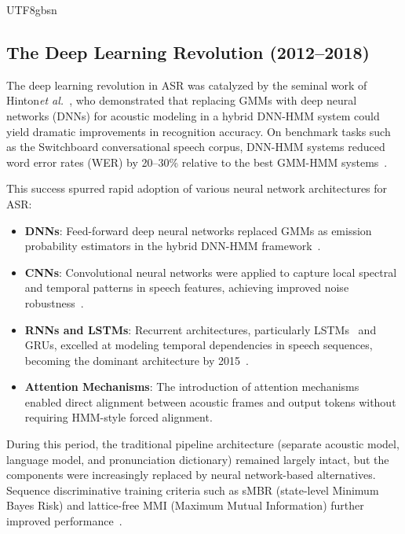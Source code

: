 \documentclass[12pt,a4paper]{article}
\newcommand{\etal}{\textit{et al.}}
\begin{document}
\begin{CJK}{UTF8}{gbsn}
\subsection{The Deep Learning Revolution (2012--2018)}
\label{subsec:dl}

The deep learning revolution in ASR was catalyzed by the seminal work of Hinton\etal~\cite{hinton2012deep}, who demonstrated that replacing GMMs with deep neural networks (DNNs) for acoustic modeling in a hybrid DNN-HMM system could yield dramatic improvements in recognition accuracy. On benchmark tasks such as the Switchboard conversational speech corpus, DNN-HMM systems reduced word error rates (WER) by 20--30\% relative to the best GMM-HMM systems~\cite{dahl2012context,seide2011conversational}.

This success spurred rapid adoption of various neural network architectures for ASR:

\begin{itemize}[leftmargin=*]
    \item \textbf{DNNs}: Feed-forward deep neural networks replaced GMMs as emission probability estimators in the hybrid DNN-HMM framework~\cite{dahl2012context,hinton2012deep}.
    \item \textbf{CNNs}: Convolutional neural networks were applied to capture local spectral and temporal patterns in speech features, achieving improved noise robustness~\cite{abdel2014convolutional,sainath2015deep}.
    \item \textbf{RNNs and LSTMs}: Recurrent architectures, particularly LSTMs~\cite{hochreiter1997long} and GRUs, excelled at modeling temporal dependencies in speech sequences, becoming the dominant architecture by 2015~\cite{graves2013speech,sak2014long}.
    \item \textbf{Attention Mechanisms}: The introduction of attention mechanisms~\cite{bahdanau2015neural} enabled direct alignment between acoustic frames and output tokens without requiring HMM-style forced alignment.
\end{itemize}

During this period, the traditional pipeline architecture (separate acoustic model, language model, and pronunciation dictionary) remained largely intact, but the components were increasingly replaced by neural network-based alternatives. Sequence discriminative training criteria such as sMBR (state-level Minimum Bayes Risk) and lattice-free MMI (Maximum Mutual Information) further improved performance~\cite{vesely2013sequence,povey2016purely}.


\end{CJK}
\end{document}
